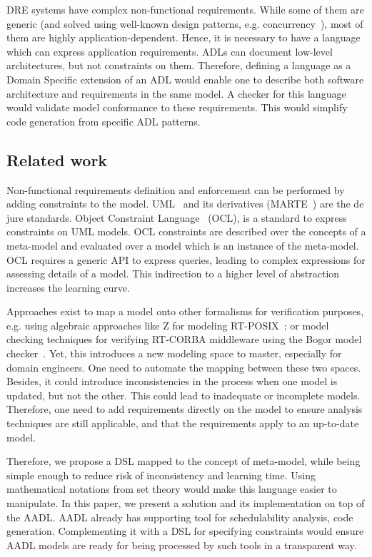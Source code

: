 \documentclass[a4paper,10pt]{article}
\newcommand{\aadl} {\textsc{AADL}}
\begin{document}
DRE systems have complex non-functional requirements. While some of
them are generic (and solved using well-known design patterns, e.g.
concurrency~\cite{douglass2002real-time-desig}), most of them are
highly application-dependent. Hence, it is necessary to have a
language which can express application requirements. ADLs can document
low-level architectures, but not constraints on them. Therefore,
defining a language as a Domain Specific extension of an ADL would
enable one to describe both software architecture and requirements in
the same model. A checker for this language would validate model
conformance to these requirements. This would simplify code generation
from specific ADL patterns.

\subsection{Related work}

Non-functional requirements definition and enforcement can be
performed by adding constraints to the
model. UML~\cite{omg2003uml-2.0-superst} and its derivatives
(MARTE~\cite{omg2007a-uml-profile-f}) are the de jure standards.
Object Constraint Language~\cite{OCL98} (OCL), is a standard to
express constraints on UML models. OCL constraints are described over
the concepts of a meta-model and evaluated over a model which is an
instance of the meta-model.  OCL requires a generic API to express
queries, leading to complex expressions for assessing details of a
model. This indirection to a higher level of abstraction increases the
learning curve.

Approaches exist to map a model onto other formalisms for verification
purposes, e.g. using algebraic approaches like Z for modeling
RT-POSIX~\cite{f06}; or model checking techniques for verifying
RT-CORBA middleware using the Bogor model checker~\cite{bogor}. Yet,
this introduces a new modeling space to master, especially for domain
engineers. One need to automate the mapping between these two
spaces. Besides, it could introduce inconsistencies in the process
when one model is updated, but not the other. This could lead to
inadequate or incomplete models. Therefore, one need to add
requirements directly on the model to ensure analysis techniques are
still applicable, and that the requirements apply to an up-to-date model.

Therefore, we propose a DSL mapped to the concept of meta-model, while
being simple enough to reduce risk of inconsistency and learning
time. Using mathematical notations from set theory would make this
language easier to manipulate. In this paper, we present a solution
and its implementation on top of the \aadl{}. \aadl{} already has
supporting tool for schedulability analysis, code
generation. Complementing it with a DSL for specifying constraints
would ensure \aadl{} models are ready for being processed by such
tools in a transparent way.
\end{document}
